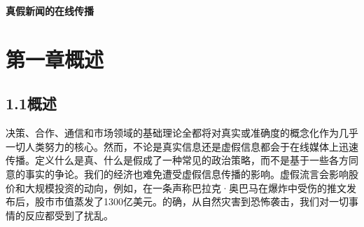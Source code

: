 \documentclass[a4paper,AutoFakeBold,oneside,12pt]{book}
\begin{document}
\begin{nopagenumber}
\begin{center}
\begin{tabular}{ccc}
	\end{tabular}
\end{center}

\newpage\backmatter

\blankmatter
\thispagestyle{empty}
\begin{center}


\end{center}

\setcounter{chapter}{0}
\renewcommand{\thefigure}{~外\arabic{chapter}-\arabic{figure}~}
\renewcommand{\theequation}{~外\arabic{chapter}-\arabic{equation}~}
\renewcommand{\thetable}{~外\arabic{chapter}-\arabic{table}~}

\begin{center}
\end{center}
\vspace{8mm}
\thispagestyle{empty}


\begin{center}
\sanhao\heiti\textbf{真假新闻的在线传播}

\xiaosihao{}

\xiaosihao{}
\end{center}

\songti{}
\begingroup %
\let\clearpage\relax
\let\cleardoublepage\relax


\chapter*{第一章\quad{}概述}
\newtranschapter

\section*{1.1\quad{}概述}
决策、合作、通信和市场领域的基础理论全都将对真实或准确度的概念化作为几乎一切人类努力的核心。然而，不论是真实信息还是虚假信息都会于在线媒体上迅速传播。定义什么是真、什么是假成了一种常见的政治策略，而不是基于一些各方同意的事实的争论。我们的经济也难免遭受虚假信息传播的影响。虚假流言会影响股价和大规模投资的动向，例如，在一条声称巴拉克·奥巴马在爆炸中受伤的推文发布后，股市市值蒸发了1300亿美元。的确，从自然灾害到恐怖袭击，我们对一切事情的反应都受到了扰乱。


\end{nopagenumber}
\end{document}
